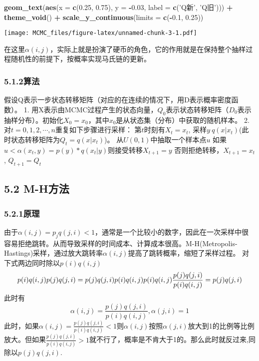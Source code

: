 \documentclass[]{article}
\newenvironment{Shaded}{\begin{snugshade}}{\end{snugshade}}
\newcommand{\KeywordTok}[1]{\textcolor[rgb]{0.13,0.29,0.53}{\textbf{#1}}}
\newcommand{\DataTypeTok}[1]{\textcolor[rgb]{0.13,0.29,0.53}{#1}}
\newcommand{\FloatTok}[1]{\textcolor[rgb]{0.00,0.00,0.81}{#1}}
\newcommand{\StringTok}[1]{\textcolor[rgb]{0.31,0.60,0.02}{#1}}
\newcommand{\OperatorTok}[1]{\textcolor[rgb]{0.81,0.36,0.00}{\textbf{#1}}}
\newcommand{\NormalTok}[1]{#1}
\begin{document}
\begin{Shaded}
\begin{Highlighting}[]
\StringTok{  }\KeywordTok{geom_text}\NormalTok{(}\KeywordTok{aes}\NormalTok{(}\DataTypeTok{x =} \KeywordTok{c}\NormalTok{(}\FloatTok{0.25}\NormalTok{, }\FloatTok{0.75}\NormalTok{), }\DataTypeTok{y =} \OperatorTok{-}\FloatTok{0.03}\NormalTok{, }\DataTypeTok{label =} \KeywordTok{c}\NormalTok{(}\StringTok{'Q新'}\NormalTok{, }\StringTok{'Q旧'}\NormalTok{))) }\OperatorTok{+}
\StringTok{  }\KeywordTok{theme_void}\NormalTok{() }\OperatorTok{+}
\StringTok{  }\KeywordTok{scale_y_continuous}\NormalTok{(}\DataTypeTok{limits =} \KeywordTok{c}\NormalTok{(}\OperatorTok{-}\FloatTok{0.1}\NormalTok{, }\FloatTok{0.25}\NormalTok{))}
\end{Highlighting}
\end{Shaded}

\texttt{[image: MCMC\_files/figure-latex/unnamed-chunk-3-1.pdf]}

在这里\(\alpha(i,j)\)，实际上就是扮演了硬币的角色，它的作用就是在保持整个抽样过程随机性的前提下，按概率实现马氏链的更新。

\subsubsection{5.1.2算法}

假设Q表示一步状态转移矩阵（对应的在连续的情况下，用D表示概率密度函数）。
1.
用X表示由MCMC过程产生的状态向量，\(Q_0\)表示状态转移矩阵（\(D_0\)表示抽样分布）。初始化\(X_0=x_0\)，其中\(x_0\)是从状态集（分布）中获取的随机样本。
2. 对\(t = 0, 1, 2, \cdots,n\)重复如下步骤进行采样：
第\(t\)时刻有\(X_t=x_t\),
采样\(y~q(x|x_t)\)(此时状态转移矩阵为\(Q_t=q(x|x_t)\))。
从\(U(0,1)\)中抽取一个样本点\(u\)
如果\(u<\alpha(x_t, y)=p(y)*q(x_t|y)\)则接受转移\(X_{t+1}=y\)
否则拒绝转移，\(X_{t+1}=x_t\), \(Q_{t+1} = Q_t\)

\subsection{5.2 M-H方法}\label{m-h}

\subsubsection{5.2.1原理}\label{-1}

由于\(\alpha(i,j)=p_{j}q(j,i) < 1\)，通常是一个比较小的数字，因此在一次采样中很容易拒绝跳转。从而导致采样的时间成本、计算成本很高。M-H(Metropolis-Hastings)采样，通过放大跳转率\(\alpha(i,j)\)提高了跳转概率，缩短了采样过程。
对下式两边同时除以\(p(i)q(i,j)\) \[
p(i)q(i,j)p(j)q(j,i)=p(j)q(j,i)p(i)q(i,j) \\ 
p(i)q(i,j)\frac{p(j)q(j,i)}{p(i)q(i,j)}=p(j)q(j,i) 
\] 此时有 \[
\alpha(i,j)=\frac{p(j)q(j,i)}{p(i)q(i,j)},\alpha(j,i)=1
\]
此时，如果\(\alpha(i,j) = \frac{p(j)q(j,i)}{p(i)q(i,j)} < 1\)则\(\alpha(i,j)\)按照\(\alpha(j,i)\)放大到1的比例等比例放大。但如果\(\frac{p(j)q(j,i)}{p(i)q(i,j)} > 1\)就不行了，概率是不肯大于1的。那么此时就反过来,同除以\(p(j)q(j,i)\).
\end{document}
